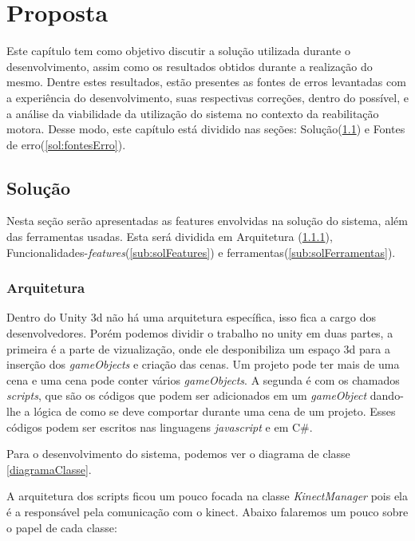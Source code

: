 \chapter[Proposta]{Proposta}\label{ch:proposta}
  Este capítulo tem como objetivo discutir a solução utilizada durante o
desenvolvimento, assim como os resultados obtidos durante a realização do mesmo. Dentre estes
resultados, estão presentes as fontes de erros levantadas com a experiência do desenvolvimento,
suas respectivas correções, dentro do possível, e a análise da viabilidade da utilização do
sistema no contexto da reabilitação motora. Desse modo, este
capítulo está dividido nas seções: Solução(\ref{sol:solucao}) e Fontes de erro(\ref{sol:fontesErro}).

\section{Solução}\label{sol:solucao}
  Nesta seção serão apresentadas as features envolvidas na solução do sistema,
além das ferramentas usadas. Esta será dividida em Arquitetura (\ref{sub:arquitetura}), Funcionalidades-\textit{features}(\ref{sub:solFeatures}) e
ferramentas(\ref{sub:solFerramentas}).

\subsection{Arquitetura}\label{sub:arquitetura}
  Dentro do Unity 3d não há uma arquitetura específica, isso fica a cargo dos desenvolvedores. Porém podemos dividir o trabalho no unity em duas partes,
a primeira é a parte de vizualização, onde ele desponibiliza um espaço 3d para a inserção dos \textit{gameObjects} e criação das cenas. Um projeto pode
ter mais de uma cena e uma cena pode conter vários \textit{gameObjects}. A segunda é com os chamados \textit{scripts}, que são os códigos que podem
ser adicionados em um \textit{gameObject} dando-lhe a lógica de como se deve comportar durante uma cena de um projeto. Esses códigos podem ser escritos
nas linguagens \textit{javascript} e em C\#.

  Para o desenvolvimento do sistema, podemos ver o diagrama de classe \ref{diagramaClasse}.

  A arquitetura dos scripts ficou um pouco focada na classe \textit{KinectManager} pois ela é a responsável pela comunicação com o kinect.
Abaixo falaremos um pouco sobre o papel de cada classe:

